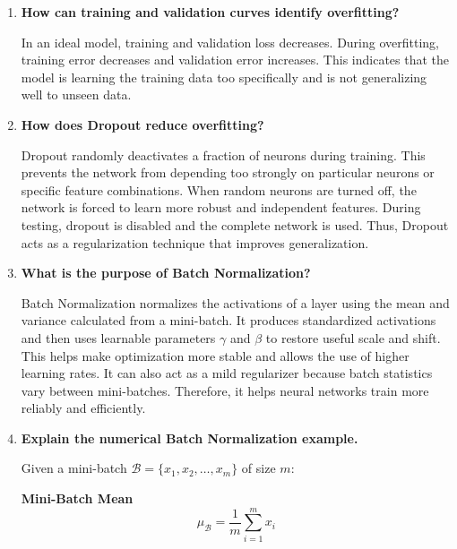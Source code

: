 \documentclass[10pt]{article}
\begin{document}
\begin{enumerate}
\item \textbf{How can training and validation curves identify overfitting?}

\vspace{5mm}
In an ideal model, training and validation loss decreases. During overfitting, training error decreases and validation error increases.
This indicates that the model is learning the training data too specifically and is not generalizing well to unseen data.
\vspace{3mm}

\item \textbf{How does Dropout reduce overfitting?}

\vspace{5mm}
Dropout randomly deactivates a fraction of neurons during training. 
This prevents the network from depending too strongly on particular neurons or specific feature combinations. 
When random neurons are turned off, the network is forced to learn more robust and independent features. 
During testing, dropout is disabled and the complete network is used. Thus, Dropout acts as a regularization technique that improves generalization.
\vspace{3mm}

\item \textbf{What is the purpose of Batch Normalization?}

\vspace{5mm}
Batch Normalization normalizes the activations of a layer using the mean and variance calculated from a mini-batch. 
It produces standardized activations and then uses learnable parameters $\gamma$ and $\beta$ to restore useful scale and shift. 
This helps make optimization more stable and allows the use of higher learning rates. 
It can also act as a mild regularizer because batch statistics vary between mini-batches. 
Therefore, it helps neural networks train more reliably and efficiently.
\vspace{3mm}

\item \textbf{Explain the numerical Batch Normalization example.}

\vspace{5mm}
Given a mini-batch $\mathcal{B} = \{x_1, x_2, \dots, x_m\}$ of size $m$:

\textbf{Mini-Batch Mean}
\begin{equation}
\mu_{\mathcal{B}} = \frac{1}{m} \sum_{i=1}^{m} x_i
\end{equation}


\end{enumerate}
\end{document}
